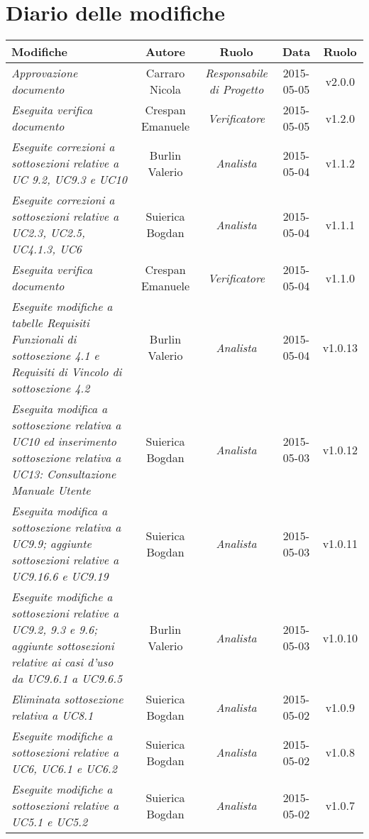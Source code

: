 \newpage
\section*{Diario delle modifiche}

\begin{table}[h]
\centering
\begin{tabular}{|p{}|c|c|c|c|}
	\toprule
		\textbf{Modifiche} & \textbf{Autore} & \textbf{Ruolo} & \textbf{Data} & \textbf{Ruolo} \\
	\midrule
	\midrule
		\textit{Approvazione documento} & Carraro Nicola & \textit{Responsabile di Progetto} & 2015-05-05 & v2.0.0 \\
	\midrule
		\textit{Eseguita verifica documento} & Crespan Emanuele & \textit{Verificatore} & 2015-05-05 & v1.2.0 \\
	\midrule
		\textit{Eseguite correzioni a sottosezioni relative a UC 9.2, UC9.3 e UC10} & Burlin Valerio & \textit{Analista} & 2015-05-04 & v1.1.2 \\
	\midrule
		\textit{Eseguite correzioni a sottosezioni relative a UC2.3, UC2.5, UC4.1.3, UC6} & Suierica Bogdan & \textit{Analista} & 2015-05-04 & v1.1.1 \\
	\midrule
		\textit{Eseguita verifica documento} & Crespan Emanuele & \textit{Verificatore} & 2015-05-04 & v1.1.0 \\
	\midrule
		\textit{Eseguite modifiche a tabelle Requisiti Funzionali di sottosezione 4.1 e Requisiti di Vincolo di sottosezione 4.2} & Burlin Valerio & \textit{Analista} & 2015-05-04 & v1.0.13 \\
	\midrule
		\textit{Eseguita modifica a sottosezione relativa a UC10 ed inserimento sottosezione relativa a UC13: Consultazione Manuale Utente} & Suierica Bogdan & \textit{Analista} & 2015-05-03 & v1.0.12 \\ 
	\midrule
		\textit{Eseguita modifica a sottosezione relativa a UC9.9; aggiunte sottosezioni relative a UC9.16.6 e UC9.19} & Suierica Bogdan & \textit{Analista} & 2015-05-03 & v1.0.11 \\ 
	\midrule
		\textit{Eseguite modifiche a sottosezioni relative a UC9.2, 9.3 e 9.6; aggiunte sottosezioni relative ai casi d'uso da UC9.6.1 a UC9.6.5} & Burlin Valerio & \textit{Analista} & 2015-05-03 & v1.0.10 \\
	\midrule
		\textit{Eliminata sottosezione relativa a UC8.1} & Suierica Bogdan & \textit{Analista} & 2015-05-02 & v1.0.9 \\
	\midrule
		\textit{Eseguite modifiche a sottosezioni relative a UC6, UC6.1 e UC6.2} & Suierica Bogdan & \textit{Analista} & 2015-05-02 & v1.0.8 \\
	\midrule
		\textit{Eseguite modifiche a sottosezioni relative a UC5.1 e UC5.2} & Suierica Bogdan & \textit{Analista} & 2015-05-02 & v1.0.7 \\
	\bottomrule
\end{tabular}	
\end{table}
